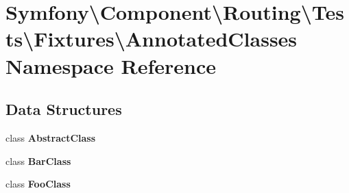 \section{Symfony\textbackslash{}Component\textbackslash{}Routing\textbackslash{}Tests\textbackslash{}Fixtures\textbackslash{}Annotated\+Classes Namespace Reference}
\label{namespace_symfony_1_1_component_1_1_routing_1_1_tests_1_1_fixtures_1_1_annotated_classes}
\subsection*{Data Structures}
\begin{DoxyCompactItemize}
\item 
class {\bf Abstract\+Class}
\item 
class {\bf Bar\+Class}
\item 
class {\bf Foo\+Class}
\end{DoxyCompactItemize}
